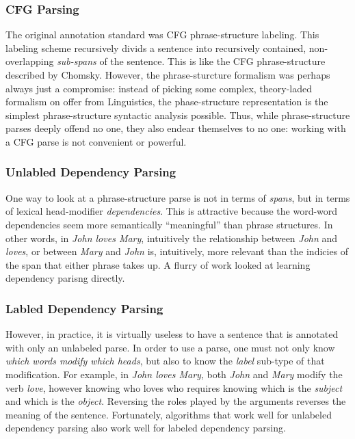 \documentclass[12pt]{article}
\begin{document}
\subsubsection{CFG Parsing}
The original annotation standard was CFG phrase-structure labeling.
This labeling scheme recursively divids a sentence into recursively contained, non-overlapping {\em sub-spans} of the sentence.
This is like the CFG phrase-structure described by Chomsky.
However, the phrase-sturcture formalism was perhaps always just a compromise: instead of picking some complex, theory-laded formalism on offer from Linguistics, the phase-structure representation is the simplest phrase-structure syntactic analysis possible.
Thus, while phrase-structure parses deeply offend no one, they also endear themselves to no one: working with a CFG parse is not convenient or powerful.
\subsubsection{Unlabled Dependency Parsing}
One way to look at a phrase-structure parse is not in terms of {\em spans}, but in terms of lexical head-modifier {\em dependencies}.
This is attractive because the word-word dependencies seem more semantically ``meaningful'' than phrase structures.
In other words, in {\em John loves Mary}, intuitively the relationship between {\em John} and {\em loves}, or between {\em Mary} and {\em John} is, intuitively, more relevant than the indicies of the span that either phrase takes up.
A flurry of work looked at learning dependency parisng directly.
\subsubsection{Labled Dependency Parsing}
However, in practice, it is virtually useless to have a sentence that is annotated with only an unlabeled parse.
In order to use a parse, one must not only know {\em which words modify which heads}, but also to know the {\em label} sub-type of that modification.
For example, in {\em John loves Mary}, both {\em John} and {\em Mary} modify the verb {\em love}, however knowing who loves who requires knowing which is the {\em subject} and which is the {\em object}.
Reversing the roles played by the arguments reverses the meaning of the sentence.
Fortunately, algorithms that work well for unlabeled dependency parsing also work well for labeled dependency parsing.
\end{document}
